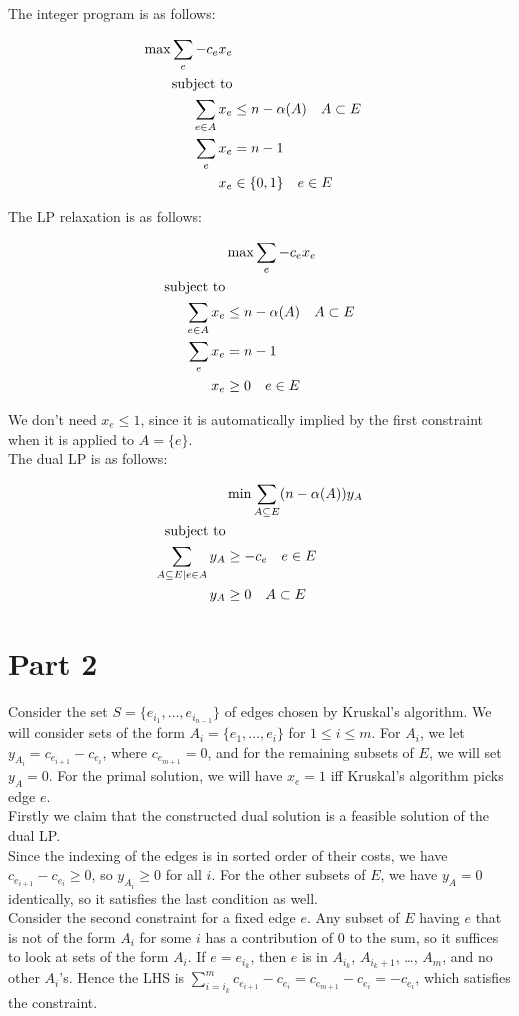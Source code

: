 \documentclass[a4paper]{article}
\newcommand{\nl}{\vspace{0.2cm}\\}
\begin{document}
The integer program is as follows:

\begin{align*}
    \max \sum_e -c_e x_e\\
    \text{subject to}\nl
    \sum_{e \in A} x_e &\le n - \alpha(A) \quad A \subset E\\
    \sum_e x_e &= n - 1\\
    x_e &\in \{0, 1\} \quad e \in E
\end{align*}

The LP relaxation is as follows:

\begin{align*}
    &\max \sum_e -c_e x_e\\
    \text{subject to}\nl
    \sum_{e \in A} x_e &\le n - \alpha(A) \quad A \subset E\\
    \sum_e x_e &= n - 1\\
    x_e &\ge 0 \quad e \in E
\end{align*}

We don't need $x_e \le 1$, since it is automatically implied by the first constraint when it is applied to $A = \{e\}$.\nl

The dual LP is as follows:

\begin{align*}
    &\min \sum_{A \subseteq E} (n - \alpha(A)) y_A\\
    \text{subject to}\nl
    \sum_{A \subseteq E \mid e \in A} y_A &\ge -c_e \quad e \in E \\
    y_A &\ge 0 \quad A \subset E\\
\end{align*}

\section{Part 2}

Consider the set $S = \{e_{i_1}, \ldots, e_{i_{n - 1}}\}$ of edges chosen by Kruskal's algorithm. We will consider sets of the form $A_i = \{e_1, \ldots, e_i\}$ for $1 \le i \le m$. For
$A_i$, we let $y_{A_i} = c_{e_{i + 1}} - c_{e_i}$, where $c_{e_{m + 1}} = 0$, and for
the remaining subsets of $E$, we will set $y_A = 0$. For the primal solution, we will have $x_e = 1$ iff Kruskal's algorithm picks edge $e$.\nl

Firstly we claim that the constructed dual solution is a feasible solution of the dual LP.\nl
Since the indexing of the edges is in sorted order of their costs, we have $c_{e_{i + 1}} - c_{e_i} \ge 0$, so $y_{A_i} \ge 0$ for all $i$. For the other subsets of $E$, we have $y_A = 0$
identically, so it satisfies the last condition as well.\nl
Consider the second constraint for a fixed edge $e$. Any subset of $E$ having $e$ that is not of the form $A_i$ for some $i$ has a contribution of $0$ to the sum, so it suffices to look at sets
of the form $A_i$. If $e = e_{i_k}$, then $e$ is in $A_{i_k}$, $A_{i_{k} + 1}$, \ldots, $A_{m}$, and no other $A_i$'s. Hence the LHS is $\sum_{i = i_k}^m c_{e_{i + 1}} - c_{e_i} = c_{e_{m + 1}}
- c_{e_i} = -c_{e_i}$, which satisfies the constraint.\nl
\end{document}
